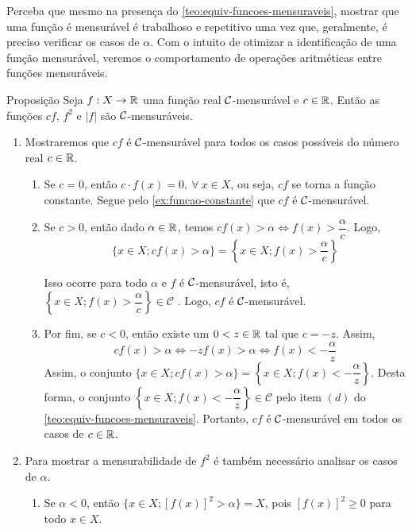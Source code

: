 Perceba que mesmo na presença do \ref{teo:equiv-funcoes-mensuraveis}, mostrar que uma função é mensurável é trabalhoso e repetitivo uma vez que, geralmente, é preciso verificar os casos de $\alpha$.
Com o intuito de otimizar a identificação de uma função mensurável, veremos o comportamento de operações aritméticas entre funções mensuráveis.
%
\begin{env}{Proposição}
\label{prop:aritmetica-uma-funcao}
Seja $f: X \to \mathbb{R}$ uma função real $\operatorname{\mathcal{C}}$-mensurável e $c \in \mathbb{R}$. Então as funções $cf$, $f^2$ e $|f|$ são $\operatorname{\mathcal{C}}$-mensuráveis. 
\vspace{-0.2cm}
\end{env}
\begin{prova}
	\vspace{-0.8cm}
    \begin{enumerate}[label*=(\alph*)]
        \item Mostraremos que $cf$ é $\operatorname{\mathcal{C}}$-mensurável para todos os casos possíveis do número real $c \in \mathbb{R}$.
            \begin{enumerate}[label=(\roman*)]
                \item Se $c = 0$, então $c\cdot f(x) = 0, \ \forall \ x \in X$, ou seja, $cf$ se torna a função constante. Segue pelo  \ref{ex:funcao-constante} que $cf$ é $\operatorname{\mathcal{C}}$-mensurável.
                
                \item Se $c>0$, então  dado $\alpha \in \mathbb{R}$, temos $cf(x) > \alpha \Leftrightarrow f(x) >\dfrac{\alpha}{c}$. 
                Logo, 
                $$
                \{x \in X; cf(x) > \alpha\} 
                = 
                \left\{x \in X; f(x) > \dfrac{\alpha}{c}\right\}
                $$
                    
                Isso ocorre para todo $\alpha$ e $f$ é $\operatorname{\mathcal{C}}$-mensurável, isto é, $\left\{x \in X; f(x) > \dfrac{\alpha}{c}\right\} \in \mathcal{C}$  . Logo, $cf$ é $\operatorname{\mathcal{C}}$-mensurável.
                
                \item Por fim, se $c < 0$, então existe um $ 0 < z \in \mathbb{R}$ tal que $c = -z$.
                Assim, 
                $$cf(x) >\alpha \Leftrightarrow -zf(x) >\alpha \Leftrightarrow f(x) < -\dfrac{\alpha}{z}$$
                Assim, o conjunto $\{x \in X; cf(x) > \alpha \} = \left\{x \in X; f(x) < -\dfrac{\alpha}{z}\right\}$.
                Desta forma, o conjunto  $\left\{x \in X; f(x) < -\dfrac{\alpha}{z}\right\}  \in \mathcal{C}$ pelo  item $(d)$ do  \ref{teo:equiv-funcoes-mensuraveis}. Portanto,  $cf$ é $\operatorname{\mathcal{C}}$-mensurável em todos os casos de $c \in \mathbb{R}$.
            \end{enumerate}
        \item Para mostrar a mensurabilidade de $f^2$ é também necessário analisar os casos de $\alpha$.
            \begin{enumerate}[label = (\roman*)]
                \item Se $\alpha < 0$, então $\{x \in X; [f(x)]^2 > \alpha\} = X$, pois $[f(x)]^2 \geq 0$ para todo $x \in X$.
                

\end{enumerate}
\end{enumerate}
\end{prova}
